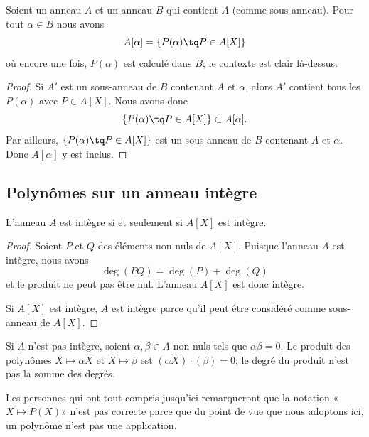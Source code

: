 \begin{proposition}     \label{PROPooPMNSooOkHOxJ}
	Soient un anneau \( A\) et un anneau \( B\) qui contient \( A\) (comme sous-anneau). Pour tout \( \alpha\in B\) nous avons
	\begin{equation}
		A[\alpha]=\{ P(\alpha)\tq P\in A[X] \}
	\end{equation}
	où encore une fois, \( P(\alpha)\) est calculé dans \( B\); le contexte est clair là-dessus.
\end{proposition}

\begin{proof}
	Si \( A'\) est un sous-anneau de \( B\) contenant \( A\) et \( \alpha\), alors \( A'\) contient tous les \( P(\alpha)\) avec \( P\in A[X]\). Nous avons donc
	\begin{equation}
		\{ P(\alpha)\tq P\in A[X] \}\subset A[\alpha].
	\end{equation}
	Par ailleurs, \( \{ P(\alpha)\tq P\in A[X] \}\) est un sous-anneau de \( B\) contenant \( A\) et \( \alpha\). Donc \( A[\alpha]\) y est inclus.
\end{proof}

\subsection{Polynômes sur un anneau intègre}

\begin{theorem}     \label{ThoBUEDrJ}
	L'anneau \( A\) est intègre si et seulement si \( A[X]\) est intègre.
\end{theorem}

\begin{proof}
	Soient \( P\) et \( Q\) des éléments non nuls de \( A[X]\). Puisque l'anneau \( A\) est intègre, nous avons
	\begin{equation}
		\deg(PQ)=\deg(P)+\deg(Q)
	\end{equation}
	et le produit ne peut pas être nul. L'anneau \( A[X]\) est donc intègre.

	Si \( A[X]\) est intègre, \( A\) est intègre parce qu'il peut être considéré comme sous-anneau de \( A[X]\).
\end{proof}

\begin{normaltext}
	Si \( A\) n'est pas intègre, soient \( \alpha,\beta\in A\) non nuls tels que \( \alpha\beta=0\). Le produit des polynômes \( X\mapsto \alpha X\) et \( X\mapsto \beta\) est \( (\alpha X)\cdot(\beta)=0\); le degré du produit n'est pas la somme des degrés.

	Les personnes qui ont tout compris jusqu'ici remarqueront que la notation «\( X\mapsto P(X)\)» n'est pas correcte parce que du point de vue que nous adoptons ici, un polynôme n'est pas une application.
\end{normaltext}


